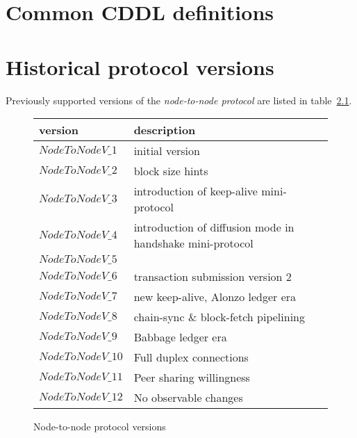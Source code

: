 \documentclass{report}
\begin{document}
\appendix

\chapter{Common CDDL definitions}
\label{cddl-common}


\chapter{Historical protocol versions}
\label{historical-protocol-versions}

Previously supported versions of the \textit{node-to-node protocol} are listed
in table~\ref{table:historical-node-to-node-protocol-versions}.
\begin{figure}[h]
  \begin{center}
    \begin{tabular}{l|l}
      version         & description \\\hline\hline
      $NodeToNodeV\_1$ & initial version \\\hline
      $NodeToNodeV\_2$ & block size hints \\\hline
      $NodeToNodeV\_3$ & introduction of keep-alive mini-protocol \\\hline
      $NodeToNodeV\_4$ & introduction of diffusion mode in handshake mini-protocol \\\hline
      $NodeToNodeV\_5$ & \\\hline
      $NodeToNodeV\_6$ & transaction submission version 2 \\\hline
      $NodeToNodeV\_7$ & new keep-alive, Alonzo ledger era \\\hline
      $NodeToNodeV\_8$ & chain-sync \& block-fetch pipelining \\\hline
      $NodeToNodeV\_9$ & Babbage ledger era \\\hline
      $NodeToNodeV\_10$ & Full duplex connections \\\hline
      $NodeToNodeV\_11$ & Peer sharing willingness \\\hline
      $NodeToNodeV\_12$ & No observable changes \\\hline
    \end{tabular}
    \caption{Node-to-node protocol versions}
    \label{table:historical-node-to-node-protocol-versions}
  \end{center}
\end{figure}
\end{document}
